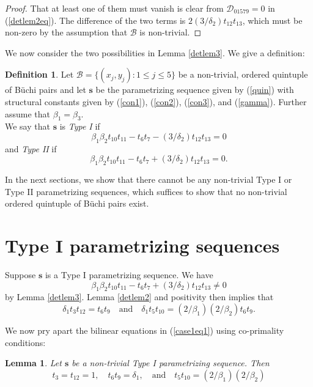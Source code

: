 \documentclass[letterpaper,10pt]{amsart}
\newcommand{\Bs}{{\mathbf{s}}}
\newcommand{\B}{{\mathcal{B}}}
\newcommand{\D}{{\mathcal{D}}}
\newtheorem{lemma}[theorem]{Lemma}
\theoremstyle{definition}
\newtheorem{definition}[theorem]{Definition}
\numberwithin{equation}{section}
\begin{document}
\begin{proof} That at least one of them must vanish is clear from $\D_{01579} = 0$ in (\ref{detlem2eq}). The difference of the two terms is $2(3/\delta_2) t_{12} t_{13}$, which must be non-zero by the assumption that $\B$ is non-trivial. 
\end{proof} 

We now consider the two possibilities in Lemma \ref{detlem3}. We give a definition: 

\begin{definition} Let $\B = \{(x_j, y_j) : 1 \leq j \leq 5\}$ be a non-trivial, ordered quintuple of B\"{u}chi pairs and let $\Bs$ be the parametrizing sequence given by (\ref{quin}) with structural constants given by (\ref{con1}), (\ref{con2}), (\ref{con3}), and (\ref{gamma}). Further assume that $\beta_1 = \beta_3$. \\

We say that $\Bs$ is \emph{Type I} if 
\[\beta_1 \beta_2 t_{10} t_{11} - t_6 t_7 - (3/\delta_2) t_{12} t_{13} = 0\]
and \emph{Type II} if 
\[\beta_1 \beta_2 t_{10} t_{11} - t_6 t_7 + (3/\delta_2) t_{12} t_{13} = 0.\]
\end{definition}

In the next sections, we show that there cannot be any non-trivial Type I or Type II parametrizing sequences, which suffices to show that no non-trivial ordered quintuple of B\"{u}chi pairs exist. 


\section{Type I parametrizing sequences} 
\label{Typ1} 

Suppose $\Bs$ is a Type I parametrizing sequence. We have 
\begin{equation} \label{case1m} \beta_1 \beta_2 t_{10} t_{11} - t_6 t_7 + (3/\delta_2) t_{12} t_{13} \ne 0
\end{equation} 
by Lemma \ref{detlem3}. Lemma \ref{detlem2} and positivity then implies that 
\begin{equation} \label{case1eq1} \delta_1 t_3 t_{12} = t_6 t_9 \quad \text{and} \quad  \delta_1 t_5 t_{10} = (2/\beta_1)(2/\beta_2) t_6 t_9.
\end{equation}

We now pry apart the bilinear equations in (\ref{case1eq1}) using co-primality conditions: 

\begin{lemma} \label{gcdlem1} Let $\Bs$ be a non-trivial Type I parametrizing sequence. Then 
\begin{equation} 
t_3  =  t_{12}    =  1, \quad t_6 t_9 = \delta_1, \quad \text{and} \quad t_5 t_{10} = (2/\beta_1)(2/\beta_2)
\end{equation} 



\end{lemma}
\end{document}
